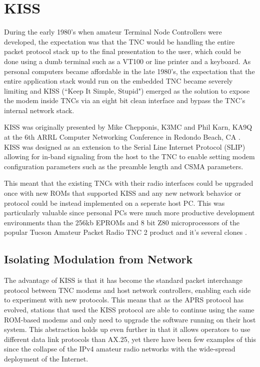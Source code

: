 \chapter{KISS}

During the early 1980's when amateur Terminal Node Controllers were developed,
the expectation was that the TNC would be handling 
the entire packet protocol stack up to the final presentation to the user, which
could be done using a dumb terminal such as a VT100 or line printer 
and a keyboard. 
As personal computers became affordable in the late 1980's, the expectation that
the entire application stack would run on the embedded TNC became severely limiting
and KISS (``Keep It Simple, Stupid") emerged as the solution to 
expose the modem inside TNCs via 
an eight bit clean interface and bypass the TNC's internal network stack.

KISS was originally presented by 
Mike Chepponis, K3MC and Phil Karn, KA9Q at the 6th ARRL Computer Networking
Conference in Redondo Beach, CA \cite{KISSspec}.
KISS was designed as an extension to the Serial Line 
Internet Protocol (SLIP) allowing for in-band signaling from 
the host to the TNC to enable setting modem 
configuration parameters such as the preamble length and CSMA parameters.

This meant that the existing TNCs with their radio interfaces could
be upgraded once with new ROMs that supported KISS and any new network behavior
or protocol could be instead implemented on a seperate host PC.
This was particularly valuable since personal PCs were much
more productive development environments than the 256kb EPROMs and 8 bit
Z80 microprocessors of the popular Tucson Amateur Packet Radio TNC 2 product
and it's several clones \cite{TNC2manual}.

\section{Isolating Modulation from Network}

The advantage of KISS is that it has become the standard packet interchange protocol
between TNC modems and host network controllers,
enabling each side to experiment with new protocols.
This means that as the APRS protocol has evolved, stations that used the
KISS protocol are able to continue using the same ROM-based modems and only
need to upgrade the software running on their host system.
This abstraction holds up even further in that it allows operators to
use different data link protocols than AX.25,
yet there have been few examples of this since the collapse of the IPv4 amateur
radio networks with the wide-spread deployment of the Internet.

